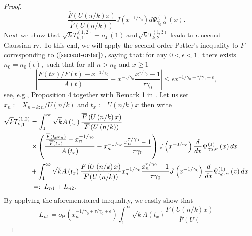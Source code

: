 \documentclass[12pt,reqno,openbib,runningheads,a4paper,portrait]{amsart}%
\begin{document}
\begin{proof}
\[\frac{\overline{F}\left(  U\left(  n/k\right)  x\right)  }{\overline{F}\left(
U\left(  n/k\right)  \right)  }J\left(  x^{-1/\gamma_{0}}\right)
d\Psi_{\gamma_{0},\alpha}^{\left(  1\right)  }\left(  x\right)  .
\]
Next we show that $\sqrt{k}T_{k,1}^{\left(  1,2\right)  }=o_{\mathbf{P}%
}\left(  1\right)  $ and$\sqrt{k}T_{k,2}^{\left(  1,2\right)  }$ leads to a
second Gaussian rv. To this end, we will apply the second-order Potter's
inequality to $\overline{F}$ corresponding to $\left(  \ref{second-order}%
\right)  ,$ saying that: for any $0<\epsilon<1,$ there exists $n_{0}%
=n_{0}\left(  \epsilon\right)  ,$ such that for all $n>n_{0}$ and $x\geq1$%
\[
\left\vert \frac{\overline{F}\left(  tx\right)  /\overline{F}\left(  t\right)
-x^{-1/\gamma_{0}}}{A\left(  t\right)  }-x^{-1/\gamma_{0}}\dfrac
{x^{\tau/\gamma_{0}}-1}{\tau\gamma_{0}}\right\vert \leq\epsilon x^{-1/\gamma
_{0}+\tau/\gamma_{0}+\epsilon},
\]
see, e.g., Proposition 4 together with Remark 1 in \cite{HJ11}. Let us set
$x_{n}:=X_{n-k:n}/U\left(  n/k\right)  $ and $t_{x}:=U\left(  n/k\right)  x$
then write%
\begin{align*}
\sqrt{k}T_{k,1}^{\left(  1,2\right)  }  &  =\int_{1}^{\infty}\sqrt{k}A\left(
t_{x}\right)  \frac{\overline{F}\left(  U\left(  n/k\right)  x\right)
}{\overline{F}\left(  U\left(  n/k\right)  \right)  }\\
&  \times\left(  \frac{\frac{\overline{F}\left(  t_{x}x_{n}\right)
}{\overline{F}\left(  t_{x}\right)  }-x_{n}^{-1/\gamma_{0}}}{A\left(
t_{x}\right)  }-x_{n}^{-1/\gamma_{0}}\frac{x_{n}^{\tau/\gamma_{0}}-1}%
{\tau\gamma_{0}}\right)  J\left(  x^{-1/\gamma_{0}}\right)  \frac{d}{dx}%
\Psi_{\gamma_{0},\alpha}^{\left(  1\right)  }\left(  x\right)  dx\\
&  +\int_{1}^{\infty}\sqrt{k}A\left(  t_{x}\right)  \frac{\overline{F}\left(
U\left(  n/k\right)  x\right)  }{\overline{F}\left(  U\left(  n/k\right)
\right)  }x_{n}^{-1/\gamma_{0}}\frac{x_{n}^{\tau/\gamma_{0}}-1}{\tau\gamma
_{0}}J\left(  x^{-1/\gamma_{0}}\right)  \frac{d}{dx}\Psi_{\gamma_{0},\alpha
}^{\left(  1\right)  }\left(  x\right)  dx\\
&
\begin{array}
[c]{c}%
=:
\end{array}
L_{n1}+L_{n2}.
\end{align*}
By applying the aforementioned inequality, we easily show that
\[
L_{n1}=o_{\mathbf{P}}\left(  x_{n}^{-1/\gamma_{0}+\tau/\gamma_{0}+\epsilon
}\right)  \int_{1}^{\infty}\sqrt{k}A\left(  t_{x}\right)  \frac{\overline
{F}\left(  U\left(  n/k\right)  x\right)  }{\overline{F}\left(  U\left(
}\]
\end{proof}
\end{document}
